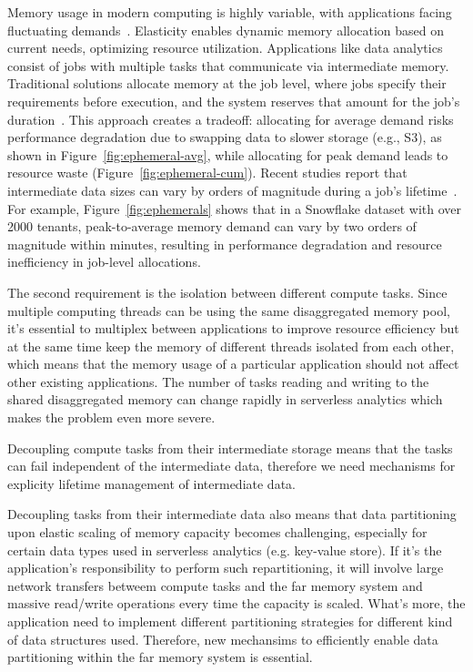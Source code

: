   Memory usage in modern computing is highly variable, with applications facing fluctuating demands~\cite{jiffy}. Elasticity enables dynamic memory allocation based on current needs, optimizing resource utilization. Applications like data analytics consist of jobs with multiple tasks that communicate via intermediate memory. Traditional solutions allocate memory at the job level, where jobs specify their requirements before execution, and the system reserves that amount for the job's duration~\cite{pocket}. This approach creates a tradeoff: allocating for average demand risks performance degradation due to swapping data to slower storage (e.g., S3), as shown in Figure~\ref{fig:ephemeral-avg}, while allocating for peak demand leads to resource waste (Figure~\ref{fig:ephemeral-cum}). Recent studies report that intermediate data sizes can vary by orders of magnitude during a job's lifetime~\cite{snowset}. For example, Figure~\ref{fig:ephemerals} shows that in a Snowflake dataset with over 2000 tenants, peak-to-average memory demand can vary by two orders of magnitude within minutes, resulting in performance degradation and resource inefficiency in job-level allocations.

 The second requirement is the isolation between different compute tasks. Since multiple computing threads can be using the same disaggregated memory pool, it's essential to multiplex between applications to improve resource efficiency but at the same time keep the memory of different threads isolated from each other, which means that the memory usage of a particular application should not affect other existing applications. The number of tasks reading and writing to the shared disaggregated memory can change rapidly in serverless analytics which makes the problem even more severe.

Decoupling compute tasks from their intermediate storage means that the tasks can fail independent of the intermediate data, therefore we need mechanisms for explicity lifetime management of intermediate data.

Decoupling tasks from their intermediate data also means that data partitioning upon elastic scaling of memory capacity becomes challenging, especially for certain data types used in serverless analytics (e.g. key-value store). If it's the application's responsibility to perform such repartitioning, it will involve large network transfers betweem compute tasks and the far memory system and massive read/write operations every time the capacity is scaled. What's more, the application need to implement different partitioning strategies for different kind of data structures used. Therefore, new mechansims to efficiently enable data partitioning within the far memory system is essential.


